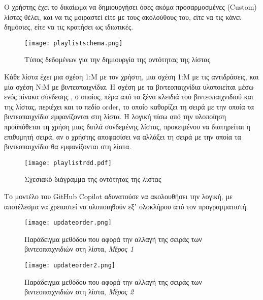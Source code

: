 Ο χρήστης έχει το δικαίωμα να δημιουργήσει όσες ακόμα προσαρμοσμένες
\textlatin{(Custom)} λίστες θέλει, και να τις μοιραστεί είτε με τους
ακολούθους του, είτε να τις κάνει δημόσιες, είτε να τις κρατήσει ως
ιδιωτικές.

\begin{figure}[H]
  \begin{center}
    \texttt{[image: playlistschema.png]}
    \label{fig:playlistSchema}
    \caption{Τύπος δεδομένων για την δημιουργία της οντότητας της
      λίστας}
  \end{center}
\end{figure}

Κάθε λίστα έχει μια σχέση 1:Μ με τον χρήστη, μια σχέση 1:Μ με τις
αντιδράσεις, και μία σχέση Ν:Μ με βιντεοπαιχνίδια. Η σχέση με τα
βιντεοπαιχνίδια υλοποιείται μέσω ενός πίνακα σύνδεσης
\cite{AtlassianJoin}, ο οποίος, πέρα από τα ξένα κλειδιά του
βιντεοπαιχνιδιού και της λίστας, περιέχει και το πεδίο
\textlatin{order}, το οποίο καθορίζει τη σειρά με την οποία τα
βιντεοπαιχνίδια εμφανίζονται στη λίστα. Η λογική πίσω από την υλοποίηση
προϋπόθεται τη χρήση μιας διπλά συνδεμένης λίστας, προκειμένου να
διατηρείται η επιθυμητή σειρά, αν ο χρήστης αποφασίσει να αλλάξει τη
σειρά με την οποία τα βιντεοπαιχνίδια θα εμφανίζονται στη λίστα.

\begin{figure}[H]
  \begin{center}
    \texttt{[image: playlistrdd.pdf]}
    \label{fig:playlistRdd}
    \caption{Σχεσιακό διάγραμμα της οντότητας της λίστας}
  \end{center}
\end{figure}

Το μοντέλο του \textlatin{GitHub Copilot} αδυνατούσε να ακολουθήσει την
λογική, με αποτέλεσμα να χρειαστεί να υλοποιηθούν εξ᾽ ολοκλήρου από τον
προγραμματιστή.

\begin{figure}[H]
  \begin{center}
    \texttt{[image: updateorder.png]}
    \label{fig:updateOrder}
    \caption{Παράδειγμα μεθόδου που αφορά την αλλαγή της σειράς των
      βιντεοπαιχνιδιών στη λίστα, \textit{Μέρος 1}}
  \end{center}
\end{figure}

\begin{figure}[H]
  \begin{center}
    \texttt{[image: updateorder2.png]}
    \label{fig:updateOrder2}
    \caption{Παράδειγμα μεθόδου που αφορά την αλλαγή της σειράς των
      βιντεοπαιχνιδιών στη λίστα, \textit{Μέρος 2}}
  \end{center}
\end{figure}

